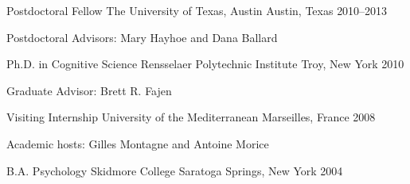 
\begin{cventries}
    
    \cventry
    {Postdoctoral Fellow}
    {The University of Texas, Austin}
    {Austin, Texas}
    {2010--2013}
    {
      \begin{cvitems} %
        \item {Postdoctoral Advisors: Mary Hayhoe and Dana Ballard}
      \end{cvitems}
    }
    

    \cventry
    {Ph.D. in Cognitive Science}
    {Rensselaer Polytechnic Institute}
    {Troy, New York}
    {2010}
    {
      \begin{cvitems} %
        \item {Graduate Advisor:  Brett R. Fajen}
      \end{cvitems}
    }
    
    
    \cventry
    {Visiting Internship}
    {University of the Mediterranean}
    {Marseilles, France}
    {2008}
    {
      \begin{cvitems} %
        \item {Academic hosts:  Gilles Montagne and Antoine Morice}
      \end{cvitems}
    }

    
    \cventry
    {B.A. Psychology}
    {Skidmore College}
    {Saratoga Springs, New York}
    {2004}
    {}
    
\end{cventries}